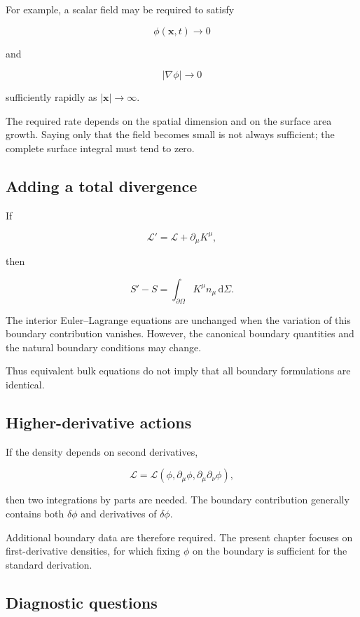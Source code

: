 For example, a scalar field may be required to satisfy

\[
\phi(\mathbf{x},t)\longrightarrow 0
\]

and

\[
|\nabla\phi|
\longrightarrow 0
\]

sufficiently rapidly as \(|\mathbf{x}|\to\infty\).

The required rate depends on the spatial dimension and on the surface area growth. Saying only that the field becomes small is not always sufficient; the complete surface integral must tend to zero.

\subsection{Adding a total divergence}

If

\[
\mathcal{L}'
=
\mathcal{L}
+
\partial_{\mu}K^{\mu},
\]

then

\[
S'-S
=
\int_{\partial\Omega}
K^{\mu}n_{\mu}
\,\mathrm{d}\Sigma.
\]

The interior Euler--Lagrange equations are unchanged when the variation of this boundary contribution vanishes. However, the canonical boundary quantities and the natural boundary conditions may change.

Thus equivalent bulk equations do not imply that all boundary formulations are identical.

\subsection{Higher-derivative actions}

If the density depends on second derivatives,

\[
\mathcal{L}
=
\mathcal{L}(
\phi,
\partial_{\mu}\phi,
\partial_{\mu}\partial_{\nu}\phi),
\]

then two integrations by parts are needed. The boundary contribution generally contains both \(\delta\phi\) and derivatives of \(\delta\phi\).

Additional boundary data are therefore required. The present chapter focuses on first-derivative densities, for which fixing \(\phi\) on the boundary is sufficient for the standard derivation.

\subsection{Diagnostic questions}

